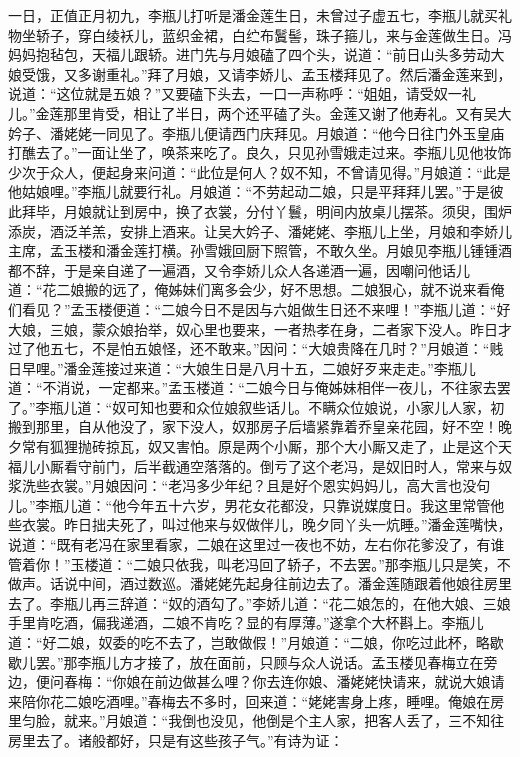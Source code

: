 一日，正值正月初九，李瓶儿打听是潘金莲生日，未曾过子虚五七，李瓶儿就买礼物坐轿子，穿白绫袄儿，蓝织金裙，白纻布鬒髻，珠子箍儿，来与金莲做生日。冯妈妈抱毡包，天福儿跟轿。进门先与月娘磕了四个头，说道：“前日山头多劳动大娘受饿，又多谢重礼。”拜了月娘，又请李娇儿、孟玉楼拜见了。然后潘金莲来到，说道：“这位就是五娘？”又要磕下头去，一口一声称呼：“姐姐，请受奴一礼儿。”金莲那里肯受，相让了半日，两个还平磕了头。金莲又谢了他寿礼。又有吴大妗子、潘姥姥一同见了。李瓶儿便请西门庆拜见。月娘道：“他今日往门外玉皇庙打醮去了。”一面让坐了，唤茶来吃了。良久，只见孙雪娥走过来。李瓶儿见他妆饰少次于众人，便起身来问道：“此位是何人？奴不知，不曾请见得。”月娘道：“此是他姑娘哩。”李瓶儿就要行礼。月娘道：“不劳起动二娘，只是平拜拜儿罢。”于是彼此拜毕，月娘就让到房中，换了衣裳，分付丫鬟，明间内放桌儿摆茶。须臾，围炉添炭，酒泛羊羔，安排上酒来。让吴大妗子、潘姥姥、李瓶儿上坐，月娘和李娇儿主席，孟玉楼和潘金莲打横。孙雪娥回厨下照管，不敢久坐。月娘见李瓶儿锺锺酒都不辞，于是亲自递了一遍酒，又令李娇儿众人各递酒一遍，因嘲问他话儿道：“花二娘搬的远了，俺姊妹们离多会少，好不思想。二娘狠心，就不说来看俺们看见？”孟玉楼便道：“二娘今日不是因与六姐做生日还不来哩！”李瓶儿道：“好大娘，三娘，蒙众娘抬举，奴心里也要来，一者热孝在身，二者家下没人。昨日才过了他五七，不是怕五娘怪，还不敢来。”因问：“大娘贵降在几时？”月娘道：“贱日早哩。”潘金莲接过来道：“大娘生日是八月十五，二娘好歹来走走。”李瓶儿道：“不消说，一定都来。”孟玉楼道：“二娘今日与俺姊妹相伴一夜儿，不往家去罢了。”李瓶儿道：“奴可知也要和众位娘叙些话儿。不瞒众位娘说，小家儿人家，初搬到那里，自从他没了，家下没人，奴那房子后墙紧靠着乔皇亲花园，好不空！晚夕常有狐狸抛砖掠瓦，奴又害怕。原是两个小厮，那个大小厮又走了，止是这个天福儿小厮看守前门，后半截通空落落的。倒亏了这个老冯，是奴旧时人，常来与奴浆洗些衣裳。”月娘因问：“老冯多少年纪？且是好个恩实妈妈儿，高大言也没句儿。”李瓶儿道：“他今年五十六岁，男花女花都没，只靠说媒度日。我这里常管他些衣裳。昨日拙夫死了，叫过他来与奴做伴儿，晚夕同丫头一炕睡。”潘金莲嘴快，说道：“既有老冯在家里看家，二娘在这里过一夜也不妨，左右你花爹没了，有谁管着你！”玉楼道：“二娘只依我，叫老冯回了轿子，不去罢。”那李瓶儿只是笑，不做声。话说中间，酒过数巡。潘姥姥先起身往前边去了。潘金莲随跟着他娘往房里去了。李瓶儿再三辞道：“奴的酒勾了。”李娇儿道：“花二娘怎的，在他大娘、三娘手里肯吃酒，偏我递酒，二娘不肯吃？显的有厚薄。”遂拿个大杯斟上。李瓶儿道：“好二娘，奴委的吃不去了，岂敢做假！”月娘道：“二娘，你吃过此杯，略歇歇儿罢。”那李瓶儿方才接了，放在面前，只顾与众人说话。孟玉楼见春梅立在旁边，便问春梅：“你娘在前边做甚么哩？你去连你娘、潘姥姥快请来，就说大娘请来陪你花二娘吃酒哩。”春梅去不多时，回来道：“姥姥害身上疼，睡哩。俺娘在房里匀脸，就来。”月娘道：“我倒也没见，他倒是个主人家，把客人丢了，三不知往房里去了。诸般都好，只是有这些孩子气。”有诗为证：

